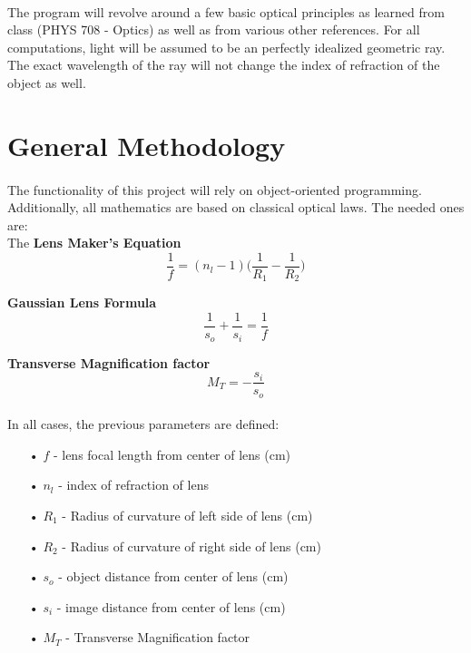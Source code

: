 \documentclass[12pt,letterpaper]{article}
\begin{document}
\paragraph*{}The program will revolve around a few basic optical principles as learned from class (PHYS 708 - Optics) as well as from various other references. For all computations, light will be assumed to be an perfectly idealized geometric ray. The exact wavelength of the ray will not change the index of refraction of the object as well.

\pagebreak

\section{General Methodology}
\paragraph*{}The functionality of this project will rely on object-oriented programming. Additionally, all mathematics are based on classical optical laws. The needed ones are: \\

The \textbf{Lens Maker's Equation}
\begin{equation}
\label{lens maker}
\frac{1}{f} = (n_l - 1)\bigg(\frac{1}{R_1} - \frac{1}{R_2}\bigg)
\end{equation}

\textbf{Gaussian Lens Formula}
\begin{equation}
\label{gauss}
\frac{1}{s_o} + \frac{1}{s_i} = \frac{1}{f}
\end{equation}

\textbf{Transverse Magnification factor}
\begin{equation}
\label{mag fact}
M_T = -\frac{s_i}{s_o}
\end{equation}

\paragraph*{} In all cases, the previous parameters are defined:
\begin{itemize}
\item[•]$f$ - lens focal length from center of lens (cm)
\item[•]$n_l$ - index of refraction of lens
\item[•]$R_1$ - Radius of curvature of left side of lens (cm)
\item[•]$R_2$ - Radius of curvature of right side of lens (cm)
\item[•]$s_o$ - object distance from center of lens (cm)
\item[•]$s_i$ - image distance from center of lens (cm)
\item[•]$M_T$ - Transverse Magnification factor
\end{itemize}
\end{document}
